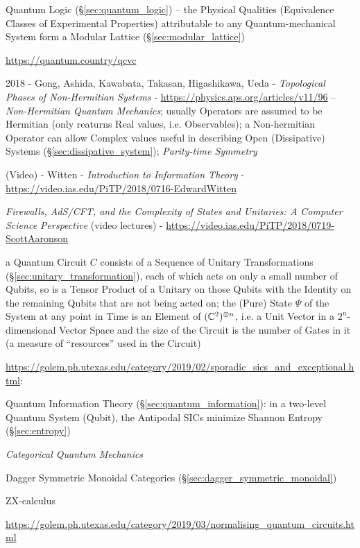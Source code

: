 Quantum Logic (\S\ref{sec:quantum_logic}) -- the Physical Qualities (Equivalence
Classes of Experimental Properties) attributable to any Quantum-mechanical
System form a Modular Lattice (\S\ref{sec:modular_lattice})

\url{https://quantum.country/qcvc}

2018 - Gong, Ashida, Kawabata, Takasan, Higashikawa, Ueda -
\emph{Topological Phases of Non-Hermitian Systems} -
\url{https://physics.aps.org/articles/v11/96} -- \emph{Non-Hermitian Quantum
  Mechanics}; usually Operators are assumed to be Hermitian (only reaturns Real
values, i.e. Observables); a Non-hermitian Operator can allow Complex values
useful in describing Open (Dissipative) Systems
(\S\ref{sec:dissipative_system}); \emph{Parity-time Symmetry}

(Video) - Witten - \emph{Introduction to Information Theory} -
\url{https://video.ias.edu/PiTP/2018/0716-EdwardWitten}

\asterism

\emph{Firewalls, AdS/CFT, and the Complexity of States and Unitaries: A Computer
  Science Perspective}
(video lectures)
-
\url{https://video.ias.edu/PiTP/2018/0719-ScottAaronson}

a Quantum Circuit $C$ consists of a Sequence of Unitary Transformations
(\S\ref{sec:unitary_transformation}), each of which acts on only a small number
of Qubits, so is a Tensor Product of a Unitary on those Qubits with the Identity
on the remaining Qubits that are not being acted on; the (Pure) State $\Psi$ of
the System at any point in Time is an Element of $(\mathbb{C}^2)^{\otimes n}$, i.e.
a Unit Vector in a $2^n$-dimensional Vector Space and the size of the Circuit is
the number of Gates in it (a measure of ``resources'' used in the Circuit)

\asterism

\url{https://golem.ph.utexas.edu/category/2019/02/sporadic_sics_and_exceptional.html}:

Quantum Information Theory (\S\ref{sec:quantum_information}): in a two-level
Quantum System (Qubit), the Antipodal SICs minimize Shannon Entropy
(\S\ref{sec:entropy})

\asterism

\emph{Categorical Quantum Mechanics}

Dagger Symmetric Monoidal Categories (\S\ref{sec:dagger_symmetric_monoidal})

ZX-calculus

\url{https://golem.ph.utexas.edu/category/2019/03/normalising_quantum_circuits.html}

